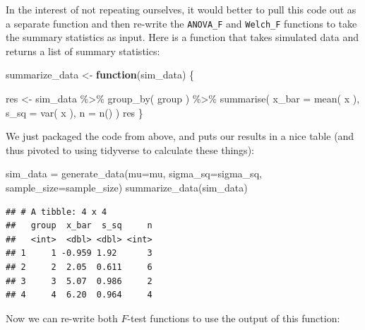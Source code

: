 \documentclass[
]{book}
\newenvironment{Shaded}{\begin{snugshade}}{\end{snugshade}}
\newcommand{\AttributeTok}[1]{\textcolor[rgb]{0.77,0.63,0.00}{#1}}
\newcommand{\ControlFlowTok}[1]{\textcolor[rgb]{0.13,0.29,0.53}{\textbf{#1}}}
\newcommand{\FunctionTok}[1]{\textcolor[rgb]{0.00,0.00,0.00}{#1}}
\newcommand{\NormalTok}[1]{#1}
\newcommand{\OtherTok}[1]{\textcolor[rgb]{0.56,0.35,0.01}{#1}}
\newcommand{\SpecialCharTok}[1]{\textcolor[rgb]{0.00,0.00,0.00}{#1}}
\begin{document}
In the interest of not repeating ourselves, it would better to pull this code out as a separate function and then re-write the \texttt{ANOVA\_F} and \texttt{Welch\_F} functions to take the summary statistics as input. Here is a function that takes simulated data and returns a list of summary statistics:

\begin{Shaded}
\begin{Highlighting}[]
\NormalTok{summarize\_data }\OtherTok{\textless{}{-}} \ControlFlowTok{function}\NormalTok{(sim\_data) \{}
  
\NormalTok{  res }\OtherTok{\textless{}{-}}\NormalTok{ sim\_data }\SpecialCharTok{\%\textgreater{}\%} \FunctionTok{group\_by}\NormalTok{( group ) }\SpecialCharTok{\%\textgreater{}\%}
    \FunctionTok{summarise}\NormalTok{( }\AttributeTok{x\_bar =} \FunctionTok{mean}\NormalTok{( x ),}
               \AttributeTok{s\_sq =} \FunctionTok{var}\NormalTok{( x ),}
               \AttributeTok{n =} \FunctionTok{n}\NormalTok{() )}
\NormalTok{  res}
\NormalTok{\}}
\end{Highlighting}
\end{Shaded}

We just packaged the code from above, and puts our results in a nice table (and thus pivoted to using tidyverse to calculate these things):

\begin{Shaded}
\begin{Highlighting}[]
\NormalTok{sim\_data }\OtherTok{=} \FunctionTok{generate\_data}\NormalTok{(}\AttributeTok{mu=}\NormalTok{mu, }\AttributeTok{sigma\_sq=}\NormalTok{sigma\_sq, }\AttributeTok{sample\_size=}\NormalTok{sample\_size)}
\FunctionTok{summarize\_data}\NormalTok{(sim\_data)}
\end{Highlighting}
\end{Shaded}

\begin{verbatim}
## # A tibble: 4 x 4
##   group  x_bar  s_sq     n
##   <int>  <dbl> <dbl> <int>
## 1     1 -0.959 1.92      3
## 2     2  2.05  0.611     6
## 3     3  5.07  0.986     2
## 4     4  6.20  0.964     4
\end{verbatim}

Now we can re-write both \(F\)-test functions to use the output of this function:
\end{document}
